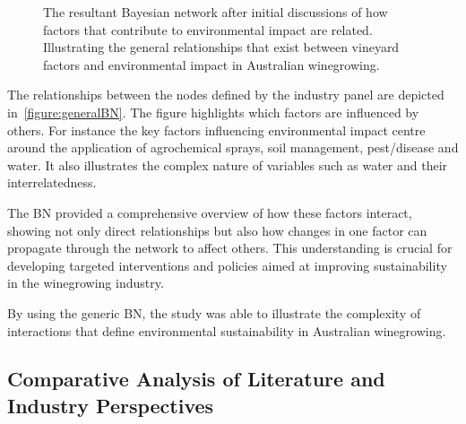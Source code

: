 
\begin{figure}[h!]
    \centering
    \caption{The resultant Bayesian network after initial discussions of how factors that contribute to environmental impact are related. Illustrating the general relationships that exist between vineyard factors and environmental impact in Australian winegrowing.}
    \label{fig:generalBN}
\end{figure}

The relationships between the nodes defined by the industry panel are depicted in~\ref{figure:generalBN}. The figure highlights which factors are influenced by others. For instance the key factors influencing environmental impact centre around the application of agrochemical sprays, soil management, pest/disease and water. It also illustrates the complex nature of variables such as water and their interrelatedness.

The BN provided a comprehensive overview of how these factors interact, showing not only direct relationships but also how changes in one factor can propagate through the network to affect others. This understanding is crucial for developing targeted interventions and policies aimed at improving sustainability in the winegrowing industry.

By using the generic BN, the study was able to illustrate the complexity of interactions that define environmental sustainability in Australian winegrowing.

\subsection{Comparative Analysis of Literature and Industry Perspectives}

